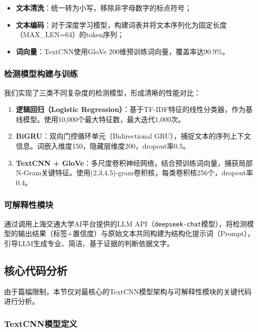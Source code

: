 \documentclass[12pt,a4paper]{article}
\begin{document}
\begin{itemize}
    \item \textbf{文本清洗}：统一转为小写，移除非字母数字的标点符号；
    \item \textbf{文本编码}：对于深度学习模型，构建词表并将文本序列化为固定长度（MAX\_LEN=64）的token序列；
    \item \textbf{词向量}：TextCNN使用GloVe 200维预训练词向量，覆盖率达90.9\%。
\end{itemize}

\subsubsection{检测模型构建与训练}

我们实现了三类不同复杂度的检测模型，形成清晰的性能对比：

\begin{enumerate}[leftmargin=2em]
    \item \textbf{逻辑回归（Logistic Regression）}：基于TF-IDF特征的线性分类器，作为基线模型。使用10,000个最大特征数，最大迭代1,000次。
    \item \textbf{BiGRU}：双向门控循环单元（Bidirectional GRU），捕捉文本的序列上下文信息。词嵌入维度150，隐藏层维度200，dropout率0.5。
    \item \textbf{TextCNN + GloVe}：多尺度卷积神经网络，结合预训练词向量，捕获局部N-Gram关键特征。使用(2,3,4,5)-gram卷积核，每类卷积核256个，dropout率0.4。
\end{enumerate}

\subsubsection{可解释性模块}

通过调用上海交通大学AI平台提供的LLM API（\texttt{deepseek-chat}模型），将检测模型的输出结果（标签+置信度）与原始文本共同构建为结构化提示词（Prompt），引导LLM生成专业、简洁、基于证据的判断依据文字。

\subsection{核心代码分析}

由于篇幅限制，本节仅对最核心的TextCNN模型架构与可解释性模块的关键代码进行分析。

\subsubsection{TextCNN模型定义}
\end{document}
